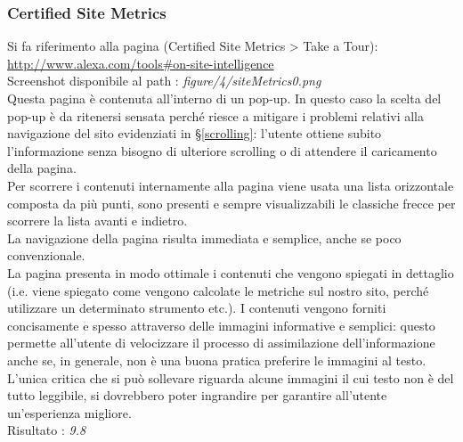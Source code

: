 \subsubsection{Certified Site Metrics}\label{metrics}
Si fa riferimento alla pagina (Certified Site Metrics > Take a Tour): \\
\url{http://www.alexa.com/tools#on-site-intelligence}
\\
Screenshot disponibile al path : \textit{figure/4/siteMetrics0.png} \\ 
Questa pagina è contenuta all'interno di un pop-up.
In questo caso la scelta del pop-up è da ritenersi sensata perch\'e riesce a 
mitigare i problemi relativi alla navigazione del sito evidenziati in 
§\ref{scrolling}: l'utente ottiene subito l'informazione senza
bisogno di ulteriore scrolling o di attendere il caricamento della pagina.\\
Per scorrere i contenuti internamente alla pagina viene usata una lista
 orizzontale composta da più punti, sono presenti e sempre
visualizzabili le classiche frecce per scorrere la lista avanti e indietro. \\
La navigazione della pagina risulta immediata e semplice, anche se poco
convenzionale. \\
La pagina presenta in modo ottimale i contenuti che vengono spiegati in 
dettaglio (i.e. viene spiegato come vengono calcolate le metriche sul
nostro sito, perch\'e utilizzare un determinato strumento etc.). I contenuti vengono
forniti concisamente e spesso attraverso delle immagini informative e
semplici: questo permette all'utente di velocizzare il processo di assimilazione
dell'informazione anche se, in generale, non è una buona pratica 
preferire le immagini al testo. L'unica critica che si può sollevare riguarda
alcune immagini il cui testo non è del tutto leggibile, si dovrebbero
poter ingrandire per garantire all'utente un'esperienza migliore.
 \\
Risultato : \textit{9.8}